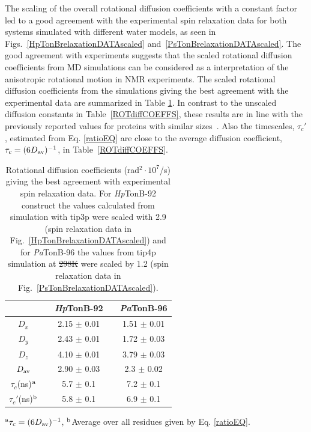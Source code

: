 \documentclass[journal=jpcbfk,manuscript=article]{achemso}
\providecommand{\DIFadd}[1]{{\protect\color{blue}\uwave{#1}}} %
\providecommand{\DIFdel}[1]{{\protect\color{red}\sout{#1}}}                      %
\providecommand{\DIFaddFL}[1]{\DIFadd{#1}} %
\providecommand{\DIFdelFL}[1]{\DIFdel{#1}} %
\providecommand{\DIFaddbeginFL}{} %
\providecommand{\DIFaddendFL}{} %
\providecommand{\DIFdelbeginFL}{} %
\providecommand{\DIFdelendFL}{} %
\begin{document}
The scaling of the overall rotational diffusion coefficients
with a constant factor led to a good agreement with the experimental
spin relaxation data for both systems simulated with different water models,
as seen in Figs.~\ref{HpTonBrelaxationDATAscaled} and~\ref{PsTonBrelaxationDATAscaled}.
The good agreement with experiments suggests that the scaled rotational diffusion coefficients
from MD simulations can be considered as a interpretation of the anisotropic rotational motion in NMR experiments.
The scaled rotational diffusion coefficients from the simulations giving the best agreement
with the experimental data are summarized in Table \ref{ROTdiffCOEFFSscaled}.
In contrast to the unscaled diffusion constants in Table~\ref{ROTdiffCOEFFS},
these results are in line with the previously reported values for proteins
with similar sizes~\cite{krishnan98}. Also the timescales, $\tau_{c}'$, estimated from 
Eq. \ref{ratioEQ} are close to the average diffusion coefficient, $\tau_{c}=(6D_{\rm av})^{-1}$,
in Table~\ref{ROTdiffCOEFFS}.
\begin{table}[!h]
  \centering
  \caption{Rotational diffusion coefficients (rad$^2\cdot 10^7$/s) giving the best agreement with experimental spin relaxation data.
    For {\it Hp}TonB-92 construct the values calculated from simulation with tip3p were scaled with 2.9
    (spin relaxation data in Fig.~\ref{HpTonBrelaxationDATAscaled}) and  for {\it Pa}TonB-96
    the values from tip4p simulation at \DIFdelbeginFL \DIFdelFL{298K }\DIFdelendFL \DIFaddbeginFL \DIFaddFL{298 K }\DIFaddendFL were scaled by 1.2 (spin relaxation data in
    Fig.~\ref{PsTonBrelaxationDATAscaled}). 
  }\label{ROTdiffCOEFFSscaled}
  \begin{tabular}{c c c c c}
    &    &  {\it Hp}TonB-92  &  & {\it Pa}TonB-96 \\
    \hline
    $D_{x}$        &    &   2.15 $\pm$ 0.01  & & 1.51  $\pm$ 0.01\\
    $D_{y}$        &    &  2.43  $\pm$ 0.01  & & 1.72  $\pm$ 0.03\\
    $D_{z}$        &    &  4.10   $\pm$ 0.01 & & 3.79  $\pm$ 0.03\\
    $D_{\rm av}$        &    &   2.90  $\pm$ 0.03  & & 2.3  $\pm$ 0.02\\
    $\tau_{c}$(ns)$^{\rm a}$  &    &  5.7   $\pm$ 0.1  & & 7.2 $\pm$ 0.1 \\
    $\tau_{c}'$(ns)$^{\rm b}$  &    &  5.8   $\pm$ 0.1 & & 6.9   $\pm$ 0.1 \\
  \end{tabular}
  \newline
  \flushleft
  $^{\rm a}\tau_{c}=(6D_{\rm av})^{-1}$, $^{\rm b}$Average over all residues given by Eq. \ref{ratioEQ}.
\end{table} 
\end{document}
